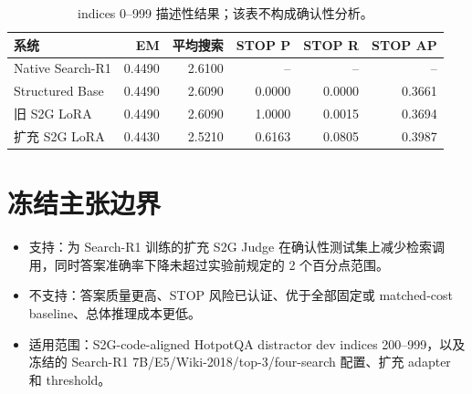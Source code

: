 \documentclass[UTF8,fontset=fandol,11pt,a4paper]{ctexart}
\begin{document}
\begin{table}[H]
\centering
\small
\caption{indices 0--999 描述性结果；该表不构成确认性分析。}
\begin{tabular}{lrrrrr}
\toprule
系统 & EM & 平均搜索 & STOP P & STOP R & STOP AP \\
\midrule
Native Search-R1 & 0.4490 & 2.6100 & -- & -- & -- \\
Structured Base & 0.4490 & 2.6090 & 0.0000 & 0.0000 & 0.3661 \\
旧 S2G LoRA & 0.4490 & 2.6090 & 1.0000 & 0.0015 & 0.3694 \\
扩充 S2G LoRA & 0.4430 & 2.5210 & 0.6163 & 0.0805 & 0.3987 \\
\bottomrule
\end{tabular}
\end{table}

\section{冻结主张边界}

\begin{itemize}[leftmargin=*]
  \item 支持：为 Search-R1 训练的扩充 S2G Judge 在确认性测试集上减少检索调用，同时答案准确率下降未超过实验前规定的 2 个百分点范围。
  \item 不支持：答案质量更高、STOP 风险已认证、优于全部固定或 matched-cost baseline、总体推理成本更低。
  \item 适用范围：S2G-code-aligned HotpotQA distractor dev indices 200--999，以及冻结的 Search-R1 7B/E5/Wiki-2018/top-3/four-search 配置、扩充 adapter 和 threshold。
\end{itemize}
\end{document}
